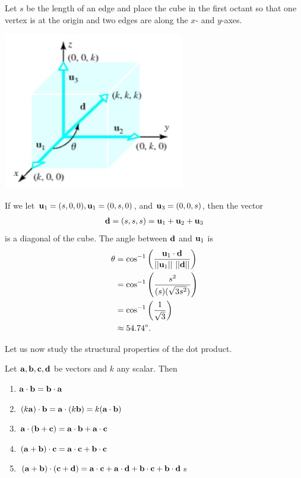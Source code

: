 \documentclass[12pt,letterpaper,reqno]{article}
\numberwithin{equation}{section}
\begin{document}
{\color{red} 
Let $s$ be the length of an edge and place the cube in the first octant so that one vertex is at the origin and two edges are along the $x$- and $y$-axes.
\begin{center}
	\includegraphics[scale=0.5]{figures_mvc/cube_coordinates}
\end{center}
If we let ${\bf u}_1=(s,0,0), {\bf u}_1=(0,s,0)$, and ${\bf u}_3=(0,0,s)$, then the vector
\begin{align*}
	{\bf d}=(s,s,s)={\bf u}_1+{\bf u}_2+{\bf u}_3
\end{align*}
is a diagonal of the cube. The angle between ${\bf d}$ and ${\bf u}_1$ is 
\begin{align*}
	\theta &=\cos^{-1}\left(\frac{{\bf u}_1 \cdot {\bf d}}{||{\bf u}_1 || \ || {\bf d}||}\right) \\
	&=\cos^{-1}\left(\frac{s^2}{(s)(\sqrt{3s^2})}\right)  \\
	&=\cos^{-1}\left(\frac{1}{\sqrt{3}}\right) \\
	&\approx 54.74^\circ.
\end{align*}
}

Let us now study the structural properties of the dot product.

\begin{prop}
	Let ${\bf a}, {\bf b}, {\bf c}, {\bf d}$ be vectors and $k$ any scalar. Then 
	\begin{enumerate}[(1)]
		\item ${\bf a}\cdot {\bf b}={\bf b} \cdot {\bf a}$
		\item $(k {\bf a})\cdot {\bf b}={\bf a}\cdot (k{\bf b})=k({\bf a}\cdot {\bf b})$
		\item ${\bf a}\cdot ({\bf b}+{\bf c})={\bf a}\cdot {\bf b}+{\bf a}\cdot {\bf c}$
		\item $({\bf a}+{\bf b})\cdot {\bf c}={\bf a}\cdot {\bf c}+{\bf b}\cdot {\bf c}$
		\item $({\bf a}+{\bf b})\cdot ({\bf c}+{\bf d})={\bf a}\cdot {\bf c}+{\bf a}\cdot {\bf d}+{\bf b}\cdot {\bf c}+{\bf b}\cdot {\bf d}$s
	\end{enumerate}
\end{prop}
\end{document}
